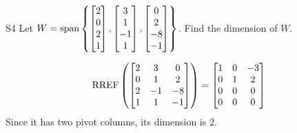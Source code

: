 \documentclass{sbgLAexam}
\begin{document}
\begin{problem}{S4}
Let \(
  W={\rm span}\left\{
    \begin{bmatrix} 2 \\ 0 \\ 2 \\ 1 \end{bmatrix},
    \begin{bmatrix} 3 \\ 1 \\ -1 \\ 1 \end{bmatrix},
    \begin{bmatrix} 0 \\ 2 \\ -8 \\ -1 \end{bmatrix}
  \right\}
\). Find the dimension of \(W\).
\end{problem}
\begin{solution}
\[
  \operatorname{RREF}\left(\begin{bmatrix}
    2 & 3 & 0 \\
    0 & 1 & 2 \\
    2 & -1 & -8 \\
    1 & 1 & -1
  \end{bmatrix} \right) =
  \begin{bmatrix}
    1 & 0 & -3 \\
    0 & 1 & 2 \\
    0 & 0 & 0 \\
    0 & 0 & 0
  \end{bmatrix}
\]
Since it has two pivot columns, its dimension is \(2\).
\end{solution}
\end{document}
